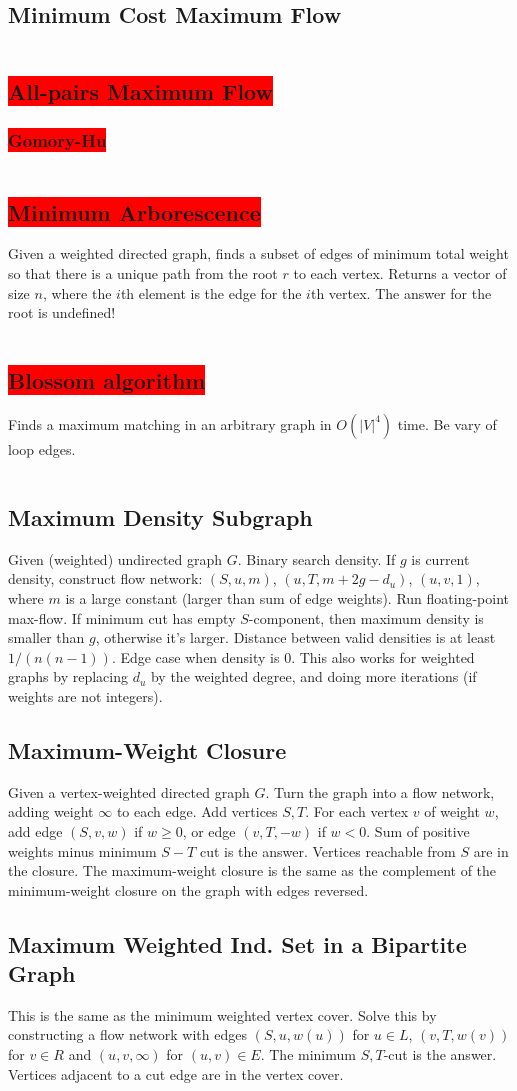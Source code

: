 \documentclass[8pt,a4paper,landscape,oneside]{amsart}
\newcommand{\code}[1]{\inputminted[fontsize=\normalsize,baselinestretch=1]{cpp}{_code/#1}}
\newcommand{\subsectionRed}[1]{\subsection{\colorbox{red}{\color{white}#1}}}
\newcommand{\subsubsectionRed}[1]{\subsubsection{\colorbox{red}{\color{white}#1}}}
\begin{document}
\begin{multicols*}{3}
  \subsection{Minimum Cost Maximum Flow}
    \code{graphs/max_flow/mcst.cpp}
  \subsectionRed{All-pairs Maximum Flow}
    \subsubsectionRed{Gomory-Hu}
      \code{graphs/max_flow/gomory_hu_tree.cpp}
  \subsectionRed{Minimum Arborescence}
    Given a weighted directed graph, finds a subset of edges of minimum
    total weight so that there is a unique path from the root $r$ to each
    vertex. Returns a vector of size $n$, where the $i$th element is the
    edge for the $i$th vertex. The answer for the root is undefined!
    \code{graphs/arborescence.cpp}
  \subsectionRed{Blossom algorithm}
    Finds a maximum matching in an arbitrary graph in $O(|V|^4)$ time. Be
    vary of loop edges.
    \code{graphs/blossom.cpp}
  \subsection{Maximum Density Subgraph}
    Given (weighted) undirected graph $G$. Binary search density. If $g$ is
    current density, construct flow network: $(S, u, m)$, $(u, T,
    m+2g-d_u)$, $(u,v,1)$, where $m$ is a large constant (larger than sum
    of edge weights). Run floating-point max-flow. If minimum cut has empty
    $S$-component, then maximum density is smaller than $g$, otherwise it's
    larger. Distance between valid densities is at least $1/(n(n-1))$. Edge
    case when density is $0$. This also works for weighted graphs by
    replacing $d_u$ by the weighted degree, and doing more iterations (if
    weights are not integers).
  \subsection{Maximum-Weight Closure}
    Given a vertex-weighted directed graph $G$. Turn the graph into a flow
    network, adding weight $\infty$ to each edge. Add vertices $S,T$. For
    each vertex $v$ of weight $w$, add edge $(S,v,w)$ if $w\geq 0$, or edge
    $(v,T,-w)$ if $w<0$. Sum of positive weights minus minimum $S-T$ cut is
    the answer. Vertices reachable from $S$ are in the closure. The
    maximum-weight closure is the same as the complement of the
    minimum-weight closure on the graph with edges reversed.
  \subsection{Maximum Weighted Ind. Set in a Bipartite Graph}
    This is the same as the minimum weighted vertex cover. Solve this by
    constructing a flow network with edges $(S,u,w(u))$ for $u\in L$,
    $(v,T,w(v))$ for $v\in R$ and $(u,v,\infty)$ for $(u,v)\in E$. The
    minimum $S,T$-cut is the answer. Vertices adjacent to a cut edge are
    in the vertex cover.

\end{multicols*}
\end{document}
